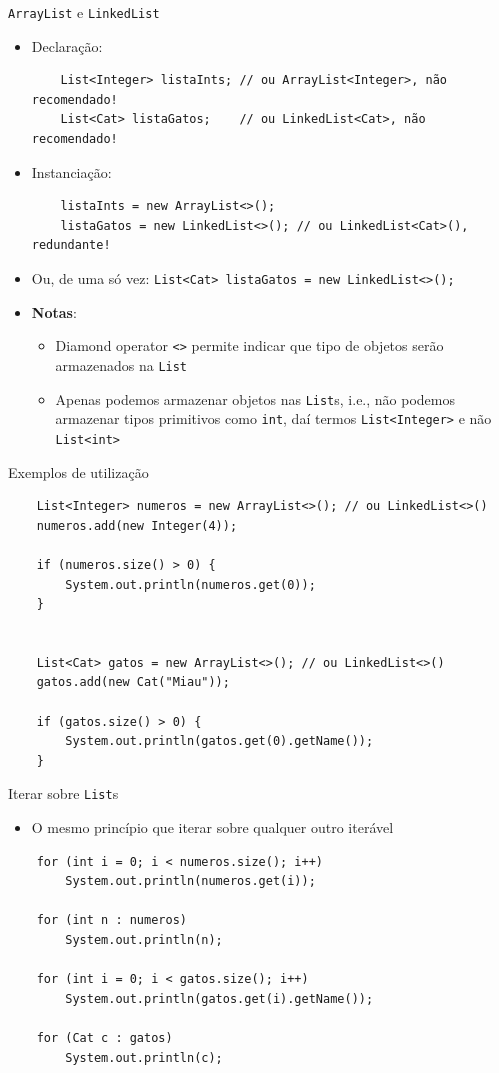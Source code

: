 \documentclass[portuguese, aspectratio=169, xcolor=table]{beamer}
\begin{document}
\begin{frame}[fragile]{\texttt{ArrayList} e \texttt{LinkedList}}
\begin{itemize}
    \item Declaração:
    \begin{verbatim}
    List<Integer> listaInts; // ou ArrayList<Integer>, não recomendado!
    List<Cat> listaGatos;    // ou LinkedList<Cat>, não recomendado!
    \end{verbatim}
    \item Instanciação:
    \begin{verbatim}
    listaInts = new ArrayList<>();
    listaGatos = new LinkedList<>(); // ou LinkedList<Cat>(), redundante! 
    \end{verbatim}
\item Ou, de uma só vez: \texttt{List<Cat> listaGatos = new LinkedList<>();}
\item \textbf{Notas}:
\begin{itemize}
    \item Diamond operator \texttt{<>} permite indicar que tipo de objetos serão armazenados na \texttt{List}
    \item Apenas podemos armazenar objetos nas \texttt{List}s, i.e., não podemos armazenar tipos primitivos como \texttt{int}, daí termos \texttt{List<Integer>} e não \texttt{List<int>}
\end{itemize}
\end{itemize}
\end{frame}

\begin{frame}[fragile]{Exemplos de utilização}
\begin{verbatim}
    List<Integer> numeros = new ArrayList<>(); // ou LinkedList<>()
    numeros.add(new Integer(4));
    
    if (numeros.size() > 0) {
        System.out.println(numeros.get(0));
    }


    List<Cat> gatos = new ArrayList<>(); // ou LinkedList<>()    
    gatos.add(new Cat("Miau"));
    
    if (gatos.size() > 0) {
        System.out.println(gatos.get(0).getName());
    }
\end{verbatim}
\end{frame}


\begin{frame}[fragile]{Iterar sobre \texttt{List}s}
 \begin{itemize}
     \item O mesmo princípio que iterar sobre qualquer outro iterável
 \end{itemize}
\begin{verbatim}
    for (int i = 0; i < numeros.size(); i++)
        System.out.println(numeros.get(i));
    
    for (int n : numeros)
        System.out.println(n);

    for (int i = 0; i < gatos.size(); i++)
        System.out.println(gatos.get(i).getName());
    
    for (Cat c : gatos)
        System.out.println(c);
\end{verbatim}
\end{frame}
\end{document}
